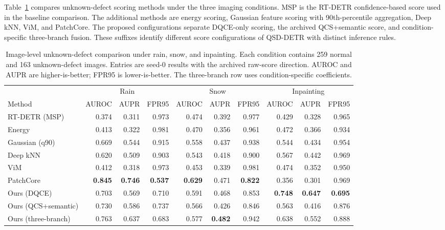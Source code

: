 Table~\ref{tab:unknown_methods} compares unknown-defect scoring methods
under the three imaging conditions. MSP is the RT-DETR
confidence-based score used in the baseline comparison. The additional
methods are energy scoring, Gaussian feature scoring with 90th-percentile
aggregation, Deep kNN, ViM, and PatchCore. The proposed configurations
separate DQCE-only scoring, the archived QCS+semantic score, and
condition-specific three-branch fusion. These suffixes identify different
score configurations of QSD-DETR with distinct inference rules.

\begin{table}[!t]
  \centering
  \caption{Image-level unknown-defect comparison under rain, snow,
  and inpainting. Each condition contains 259 normal and 163 unknown-defect
  images. Entries are seed-0 results with the archived raw-score direction.
  AUROC and AUPR are higher-is-better; FPR95 is lower-is-better.
  The three-branch row uses condition-specific coefficients.}
  \label{tab:unknown_methods}
  {\QSDexpTableStyle
  \begin{tabular*}{\textwidth}{@{\extracolsep{\fill}}lrrrrrrrrr@{}}
    \toprule
    & \multicolumn{3}{c}{Rain} & \multicolumn{3}{c}{Snow}
    & \multicolumn{3}{c}{Inpainting} \\
    \cmidrule(lr){2-4}\cmidrule(lr){5-7}\cmidrule(lr){8-10}
    Method & AUROC & AUPR & FPR95 & AUROC & AUPR & FPR95
    & AUROC & AUPR & FPR95 \\
    \midrule
    RT-DETR (MSP) & 0.374 & 0.311 & 0.973 & 0.474 & 0.392 & 0.977 & 0.429 & 0.328 & 0.965 \\
    Energy        & 0.413 & 0.322 & 0.981 & 0.470 & 0.356 & 0.961 & 0.472 & 0.366 & 0.934 \\
    Gaussian (q90)& 0.669 & 0.544 & 0.915 & 0.558 & 0.437 & 0.938 & 0.544 & 0.434 & 0.954 \\
    Deep kNN      & 0.620 & 0.509 & 0.903 & 0.543 & 0.418 & 0.900 & 0.567 & 0.442 & 0.969 \\
    ViM           & 0.412 & 0.318 & 0.973 & 0.453 & 0.339 & 0.981 & 0.474 & 0.352 & 0.950 \\
    PatchCore     & \textbf{0.845} & \textbf{0.746} & \textbf{0.537}
                  & \textbf{0.629} & 0.471 & \textbf{0.822} & 0.356 & 0.301 & 0.969 \\
    \midrule
    Ours (DQCE)   & 0.703 & 0.569 & 0.710 & 0.591 & 0.468 & 0.853
                  & \textbf{0.748} & \textbf{0.647} & \textbf{0.695} \\
    Ours (QCS+semantic)
                  & 0.730 & 0.586 & 0.737 & 0.566 & 0.426 & 0.846 & 0.563 & 0.416 & 0.876 \\
    Ours (three-branch)
                  & 0.763 & 0.637 & 0.683 & 0.577 & \textbf{0.482} & 0.942 & 0.638 & 0.552 & 0.888 \\
    \bottomrule
  \end{tabular*}}
\end{table}

